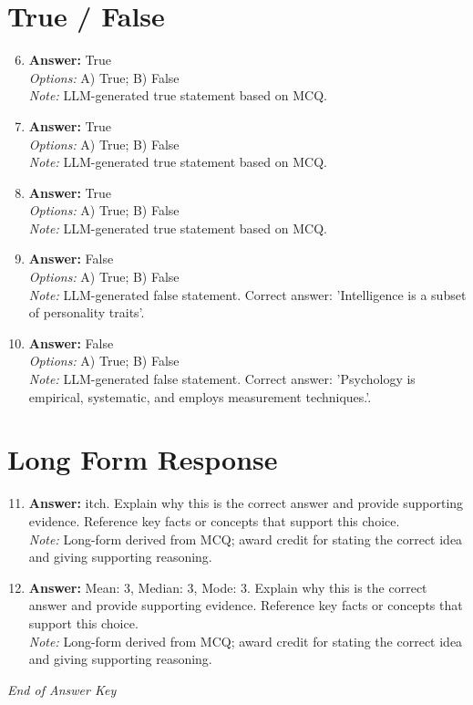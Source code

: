 \documentclass[12pt]{article}
\begin{document}
\section*{True / False}
\begin{enumerate}[label=\arabic*.]
\setcounter{enumi}{5}
\item \textbf{Answer:} True
\\ \textit{Options:} A) True; B) False
\\ \textit{Note:} LLM-generated true statement based on MCQ.
\item \textbf{Answer:} True
\\ \textit{Options:} A) True; B) False
\\ \textit{Note:} LLM-generated true statement based on MCQ.
\item \textbf{Answer:} True
\\ \textit{Options:} A) True; B) False
\\ \textit{Note:} LLM-generated true statement based on MCQ.
\item \textbf{Answer:} False
\\ \textit{Options:} A) True; B) False
\\ \textit{Note:} LLM-generated false statement. Correct answer: 'Intelligence is a subset of personality traits'.
\item \textbf{Answer:} False
\\ \textit{Options:} A) True; B) False
\\ \textit{Note:} LLM-generated false statement. Correct answer: 'Psychology is empirical, systematic, and employs measurement techniques.'.
\end{enumerate}

\section*{Long Form Response}
\begin{enumerate}[label=\arabic*.]
\setcounter{enumi}{10}
\item \textbf{Answer:} itch. Explain why this is the correct answer and provide supporting evidence. Reference key facts or concepts that support this choice.
\\ \textit{Note:} Long-form derived from MCQ; award credit for stating the correct idea and giving supporting reasoning.
\item \textbf{Answer:} Mean: 3, Median: 3, Mode: 3. Explain why this is the correct answer and provide supporting evidence. Reference key facts or concepts that support this choice.
\\ \textit{Note:} Long-form derived from MCQ; award credit for stating the correct idea and giving supporting reasoning.
\end{enumerate}

\vfill
\noindent\textit{End of Answer Key}
\end{document}

